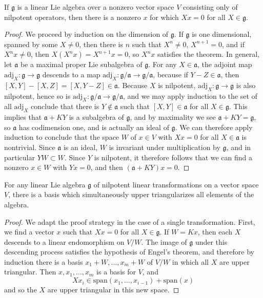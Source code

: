 \begin{lemma}
    If $\mathfrak{g}$ is a linear Lie algebra over a nonzero vector space $V$ consisting only of nilpotent operators, then there is a nonzero $x$ for which $Xx = 0$ for all $X \in \mathfrak{g}$.
\end{lemma}
\begin{proof}
    We proceed by induction on the dimension of $\mathfrak{g}$. If $\mathfrak{g}$ is one dimensional, spanned by some $X \neq 0$, then there is $n$ such that $X^n \neq 0$, $X^{n+1} = 0$, and if $X^n x \neq 0$, then $X(X^n x) = X^{n+1}x = 0$, so $X^nx$ satisfies the theorem. In general, let $\mathfrak{a}$ be a maximal proper Lie subalgebra of $\mathfrak{g}$. For any $X \in \mathfrak{a}$, the adjoint map $\text{adj}_X: \mathfrak{g} \to \mathfrak{g}$ descends to a map $\text{adj}_X: \mathfrak{g}/\mathfrak{a} \to \mathfrak{g}/\mathfrak{a}$, because if $Y - Z \in \mathfrak{a}$, then $[X,Y] - [X,Z] = [X,Y-Z] \in \mathfrak{a}$. Because $X$ is nilpotent, $\text{adj}_X: \mathfrak{g} \to \mathfrak{g}$ is also nilpotent, hence so is $\text{adj}_X: \mathfrak{g}/\mathfrak{a} \to \mathfrak{g}/\mathfrak{a}$, and we may apply induction to the set of all $\text{adj}_X$ conclude that there is $Y \not \in \mathfrak{a}$ such that $[X,Y] \in \mathfrak{a}$ for all $X \in \mathfrak{g}$. This implies that $\mathfrak{a} + KY$ is a subalgebra of $\mathfrak{g}$, and by maximality we see $\mathfrak{a} + KY = \mathfrak{g}$, so $\mathfrak{a}$ has codimension one, and is actually an ideal of $\mathfrak{g}$. We can therefore apply induction to conclude that the space $W$ of $x \in V$ with $Xx = 0$ for all $X \in \mathfrak{a}$ is nontrivial. Since $\mathfrak{a}$ is an ideal, $W$ is invariant under multiplication by $\mathfrak{g}$, and in particular $YW \subset W$. Since $Y$ is nilpotent, it therefore follows that we can find a nonzero $x \in W$ with $Yx = 0$, and then $(\mathfrak{a} + KY)x = 0$.
\end{proof}

\begin{theorem}[Engel]
    For any linear Lie algebra $\mathfrak{g}$ of nilpotent linear transformations on a vector space $V$, there is a basis which simultaneously upper triangularizes all elements of the algebra.
\end{theorem}
\begin{proof}
    We adapt the proof strategy in the case of a single transformation. First, we find a vector $x$ such that $Xx = 0$ for all $X \in \mathfrak{g}$. If $W = Kx$, then each $X$ descends to a linear endomorphism on $V/W$. The image of $\mathfrak{g}$ under this descending process satisfies the hypothesis of Engel's theorem, and therefore by induction there is a basis $x_1 + W, \dots, x_m + W$ of $V/W$ in which all $X$ are upper triangular. Then $x, x_1, \dots, x_m$ is a basis for $V$, and
    \[ Xx_i \in \text{span}(x_1, \dots, x_{i-1}) + \text{span}(x) \]
    and so the $X$ are upper triangular in this new space.
\end{proof}

